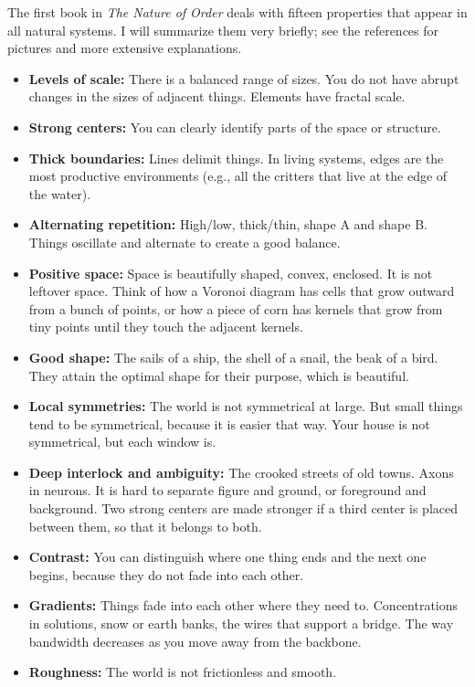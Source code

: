 The first book in \textit{The Nature of Order} deals with fifteen properties
that appear in all natural systems. I will summarize them very briefly; see the
references for pictures and more extensive explanations.
\begin{itemize}
 \item \textbf{Levels of scale:} There is a balanced range of sizes. You do not
have abrupt changes in the sizes of adjacent things. Elements have fractal
scale.
 \item \textbf{Strong centers:} You can clearly identify parts of the space or
structure.
 \item \textbf{Thick boundaries:} Lines delimit things. In living systems, edges
are the most productive environments (e.g., all the critters that live at the
edge of the water).
 \item \textbf{Alternating repetition:} High/low, thick/thin, shape A and shape
B. Things oscillate and alternate to create a good balance.
 \item \textbf{Positive space:} Space is beautifully shaped, convex, enclosed.
It is not leftover space. Think of how a Voronoi diagram has cells that grow
outward from a bunch of points, or how a piece of corn has kernels that grow
from tiny points until they touch the adjacent kernels.
 \item \textbf{Good shape:} The sails of a ship, the shell of a snail, the beak
of a bird. They attain the optimal shape for their purpose, which is beautiful.
 \item \textbf{Local symmetries:} The world is not symmetrical at large. But
small things tend to be symmetrical, because it is easier that way. Your house
is not symmetrical, but each window is.
 \item \textbf{Deep interlock and ambiguity:} The crooked streets of old towns.
Axons in neurons. It is hard to separate figure and ground, or foreground and
background. Two strong centers are made stronger if a third center is placed
between them, so that it belongs to both.
 \item \textbf{Contrast:} You can distinguish where one thing ends and the next
one begins, because they do not fade into each other.
 \item \textbf{Gradients:} Things fade into each other where they need to.
Concentrations in solutions, snow or earth banks, the wires that support a
bridge. The way bandwidth decreases as you move away from the backbone.
 \item \textbf{Roughness:} The world is not frictionless and smooth.

\end{itemize}
